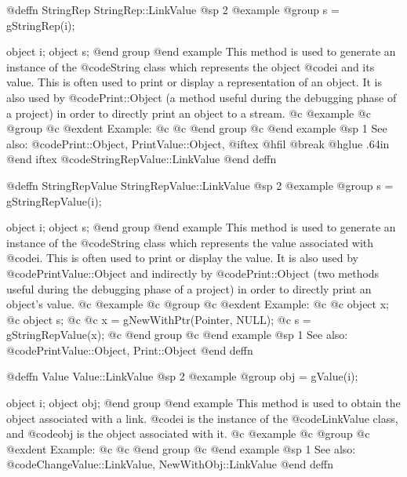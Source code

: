 @deffn {StringRep} StringRep::LinkValue
@sp 2
@example
@group
s = gStringRep(i);

object  i;
object  s;
@end group
@end example
This method is used to generate an instance of the @code{String} class
which represents the object @code{i} and its value.  This is often used
to print or display a representation of an object.  It is also used
by @code{Print::Object} (a method useful during the debugging phase of
a project) in order to directly print an object to a stream.
@c @example
@c @group
@c @exdent Example:
@c 
@c @end group
@c @end example
@sp 1
See also:  @code{Print::Object, PrintValue::Object,}
@iftex
@hfil @break @hglue .64in      
@end iftex
@code{StringRepValue::LinkValue}
@end deffn









@deffn {StringRepValue} StringRepValue::LinkValue
@sp 2
@example
@group
s = gStringRepValue(i);

object  i;
object  s;
@end group
@end example
This method is used to generate an instance of the @code{String} class
which represents the value associated with @code{i}.  This is often
used to print or display the value.  It is also used by
@code{PrintValue::Object} and indirectly by @code{Print::Object}
(two methods useful during the debugging phase of a project)
in order to directly print an object's value.
@c @example
@c @group
@c @exdent Example:
@c 
@c object  x;
@c object  s;
@c 
@c x = gNewWithPtr(Pointer, NULL);
@c s = gStringRepValue(x);
@c @end group
@c @end example
@sp 1
See also:  @code{PrintValue::Object, Print::Object}
@end deffn






@deffn {Value} Value::LinkValue
@sp 2
@example
@group
obj = gValue(i);

object  i;
object  obj;
@end group
@end example
This method is used to obtain the object associated with a link.
@code{i} is the instance of the @code{LinkValue} class, and
@code{obj} is the object associated with it.
@c @example
@c @group
@c @exdent Example:
@c 
@c @end group
@c @end example
@sp 1
See also:  @code{ChangeValue::LinkValue, NewWithObj::LinkValue}
@end deffn









